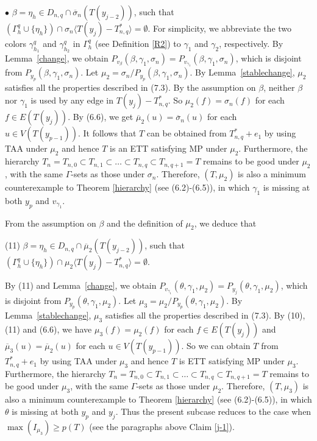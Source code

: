 \documentclass[11pt]{article}
\begin{document}
$\bullet$ $\beta=\eta_{h}\in D_{n,q}\cap \overline{\sigma}_n(T(y_{j-2}))$, such that $(\Gamma^{q}_h \cup \{\eta_{h}\}) 
\cap \sigma_n \langle T(y_j) - T_{n,q}^* \rangle=\emptyset$. For simplicity, we abbreviate the two colors $\gamma^{q}_{h_1}$ and $\gamma^{q}_{h_2}$ in $\Gamma^{q}_h$ (see Definition \ref{R2}) to $\gamma_1$ and $\gamma_2$, respectively.  
By Lemma~\ref{change}, we obtain $P_{v_{\beta}} (\beta, \gamma_1, \sigma_n) = P_{v_{\gamma_1}}(\beta, \gamma_1, \sigma_n)$, 
which is disjoint from $P_{y_p}(\beta, \gamma_1, \sigma_n)$.  Let $\mu_2=\sigma_n/P_{y_p}(\beta, \gamma_1, \sigma_n)$.
By Lemma~\ref{stablechange},  $\mu_2$ satisfies all the properties described in (7.3). By the assumption on $\beta$,
neither $\beta$ nor $\gamma_1$ is used by any edge in $T(y_j) - T_{n,q}^*$. So $\mu_2(f)=\sigma_n(f)$ for each $f\in E(T(y_j))$. 
By (6.6), we get $\overline{\mu}_2(u)=\overline{\sigma}_n(u)$ for each $u\in V(T(y_{p-1}))$. It follows that $T$ can 
be obtained from $T_{n,q}^*+e_1$ by using TAA under $\mu_2$ and hence $T$ is an ETT satisfying MP under $\mu_2$. Furthermore, the 
hierarchy $T_n=T_{n,0} \subset T_{n,1} \subset \ldots \subset T_{n,q} \subset T_{n,q+1}=T$ remains to be good under 
$\mu_2$, with the same $\Gamma$-sets as those under $\sigma_n$. Therefore, $(T, \mu_2)$ is also a minimum counterexample 
to Theorem \ref{hierarchy} (see (6.2)-(6.5)), in which $\gamma_1$ is missing at both $y_p$ and $v_{\gamma_1}$. 

From the assumption on $\beta$ and the definition of $\mu_2$, we deduce that 

(11) $\beta=\eta_{h}\in D_{n,q}\cap \overline{\mu}_2(T(y_{j-2}))$, such that $(\Gamma^{q}_h \cup \{\eta_{h}\}) 
\cap \mu_2 \langle T(y_j) - T_{n,q}^* \rangle=\emptyset$. 

By (11) and Lemma~\ref{change}, we obtain $P_{v_{\gamma_1}} (\theta, \gamma_1, \mu_2) = P_{y_j}(\theta, \gamma_1, 
\mu_2)$, which is disjoint from $P_{y_p}(\theta, \gamma_1, \mu_2)$. Let $\mu_3=\mu_2/P_{y_p}(\theta, \gamma_1, \mu_2)$.
By Lemma~\ref{stablechange},  $\mu_3$ satisfies all the properties described in (7.3). By (10), (11) and (6.6),
we have $\mu_3(f)=\mu_2(f)$ for each $f\in E(T(y_j))$ and $\overline{\mu}_3(u)=\overline{\mu}_2(u)$ for each 
$u\in V(T(y_{p-1}))$.  So we can obtain $T$ from $T_{n,q}^*+e_1$ by using TAA under $\mu_3$ and hence $T$ is ETT satisfying MP 
under $\mu_3$. Furthermore, the hierarchy $T_n=T_{n,0} \subset T_{n,1} \subset \ldots \subset T_{n,q} \subset 
T_{n,q+1}=T$ remains to be good under $\mu_3$, with the same $\Gamma$-sets as those under $\mu_2$. Therefore, 
$(T, \mu_3)$ is also a minimum counterexample to Theorem \ref{hierarchy} (see (6.2)-(6.5)), in which $\theta$ is 
missing at both $y_p$ and $y_j$. Thus the present subcase reduces to the case when $\max(I_{\mu_3}) \ge p(T)$ (see 
the paragraphs above Claim \ref{j-1}).
\end{document}
